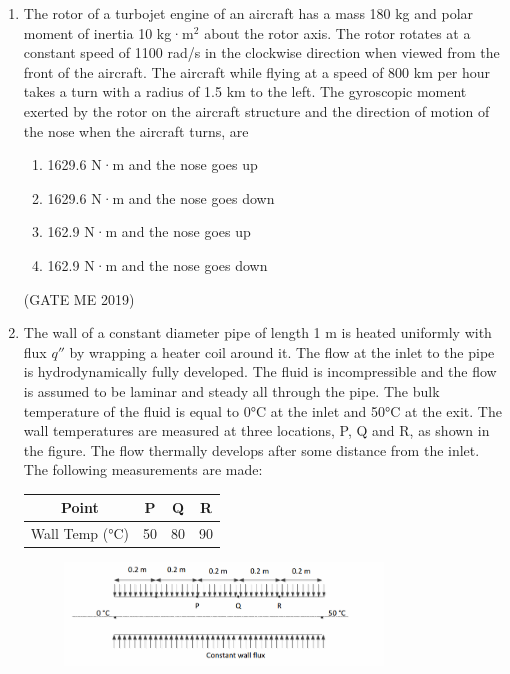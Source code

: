 \documentclass[journal]{IEEEtran}
\begin{document}
\begin{enumerate}
\begin{multicols}{4}
\begin{enumerate}
\item 0  
\item 10  
\item 15  
\item 25  
\end{enumerate}
\end{multicols}
\hfill (GATE ME 2019)

\item The rotor of a turbojet engine of an aircraft has a mass 180 kg and polar moment of inertia 10 kg·m$^2$ about the rotor axis. The rotor rotates at a constant speed of 1100 rad/s in the clockwise direction when viewed from the front of the aircraft. The aircraft while flying at a speed of 800 km per hour takes a turn with a radius of 1.5 km to the left. The gyroscopic moment exerted by the rotor on the aircraft structure and the direction of motion of the nose when the aircraft turns, are
\begin{enumerate}
\item 1629.6 N·m and the nose goes up
\item 1629.6 N·m and the nose goes down
\item 162.9 N·m and the nose goes up
\item 162.9 N·m and the nose goes down
\end{enumerate}
\hfill (GATE ME 2019)

\item The wall of a constant diameter pipe of length 1 m is heated uniformly with flux $ q'' $ by wrapping a heater coil around it. The flow at the inlet to the pipe is hydrodynamically fully developed. The fluid is incompressible and the flow is assumed to be laminar and steady all through the pipe. The bulk temperature of the fluid is equal to 0°C at the inlet and 50°C at the exit. The wall temperatures are measured at three locations, P, Q and R, as shown in the figure. The flow thermally develops after some distance from the inlet. The following measurements are made:

\begin{tabular}{|c|c|c|c|}
\hline
Point & P & Q & R \\
\hline
Wall Temp (°C) & 50 & 80 & 90 \\
\hline
\end{tabular}

\begin{figure}[H]
\centering
\includegraphics[width=0.8\textwidth]{Fig 10.png}
\caption{}
\label{fig:question32}
\end{figure}


\end{enumerate}
\end{document}
